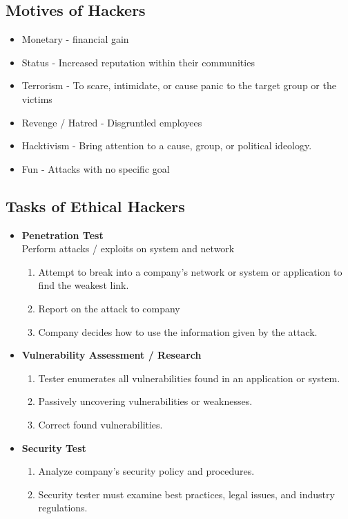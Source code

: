 \subsection{Motives of Hackers}
\begin{itemize}
    \item Monetary - financial gain
    \item Status - Increased reputation within their communities
    \item Terrorism - To scare, intimidate, or cause panic to the target group or the victims
    \item Revenge / Hatred - Disgruntled employees
    \item Hacktivism - Bring attention to a cause, group, or political ideology.
    \item Fun - Attacks with no specific goal
\end{itemize}

\subsection{Tasks of Ethical Hackers}
\begin{itemize}
    \item \textbf{Penetration Test}\\ Perform attacks / exploits on system and network
    \begin{enumerate}
        \item Attempt to break into a company's network or system or application to find the weakest link.
        \item Report on the attack to company
        \item Company decides how to use the information given by the attack.
    \end{enumerate}
    \item \textbf{Vulnerability Assessment / Research}\\
    \begin{enumerate}
        \item Tester enumerates all vulnerabilities found in an application or system.
        \item Passively uncovering vulnerabilities or weaknesses.
        \item Correct found vulnerabilities.
    \end{enumerate}
    \item \textbf{Security Test}\\
    \begin{enumerate}
        \item Analyze company's security policy and procedures.
        \item Security tester must examine best practices, legal issues, and industry regulations.
    \end{enumerate}
\end{itemize}


